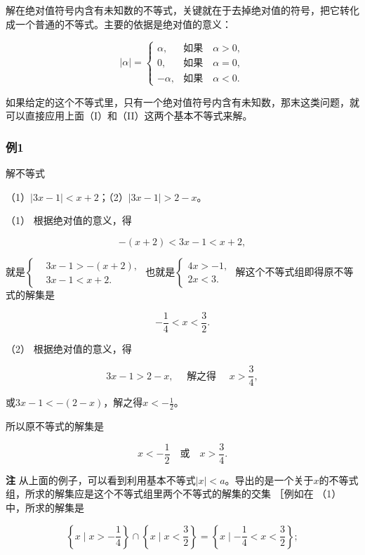 解在绝对值符号内含有未知数的不等式，关键就在于去掉绝对值的符号，把它转化成一个普通的不等式。主要的依据是绝对值的意义：

\[
| \alpha | = \left\{ \begin{array}{ll} \alpha, & \text{如果} \quad \alpha > 0, \\ 0, & \text{如果} \quad \alpha = 0, \\ - \alpha, & \text{如果} \quad \alpha < 0. \end{array} \right.
\]

如果给定的这个不等式里，只有一个绝对值符号内含有未知数，那末这类问题，就可以直接应用上面（I）和（II）这两个基本不等式来解。

\subsubsection{例1}

解不等式

（1）\(|3x - 1| < x + 2\)；（2）\(|3x - 1| > 2 - x\)。

 （1） 根据绝对值的意义，得

\[
- (x + 2) < 3 x - 1 < x + 2,
\]

就是\(\left\{\begin{aligned}&3x-1>-(x+2),\\ &3x-1<x+2.\end{aligned}\right.\)
也就是\(\left\{ \begin{array}{l} 4x > -1, \\ 2x < 3. \end{array} \right.\)
解这个不等式组即得原不等式的解集是

\[
- \frac{1}{4} < x < \frac{3}{2}.
\]

（2） 根据绝对值的意义，得

\[
3 x - 1 > 2 - x, \quad \text{ 解之得 } \quad x > \frac{3}{4},
\]

或\(3x - 1 < -(2 - x)\)，解之得\(x < -\frac{1}{2}\)。

所以原不等式的解集是

\[
x < - \frac{1}{2} \quad \text{或} \quad x > \frac{3}{4}.
\]

\textbf{注}
从上面的例子，可以看到利用基本不等式\(|x| < a\)。导出的是一个关于\(x\)的不等式组，所求的解集应是这个不等式组里两个不等式的解集的交集
［例如在 （1） 中，所求的解集是

\[
\left\{x\mid x>-\frac14\right\} \cap \left\{x\mid x<\frac32\right\} = \left\{x \mid - \frac{1}{4} < x < \frac{3}{2} \right\};
\]

